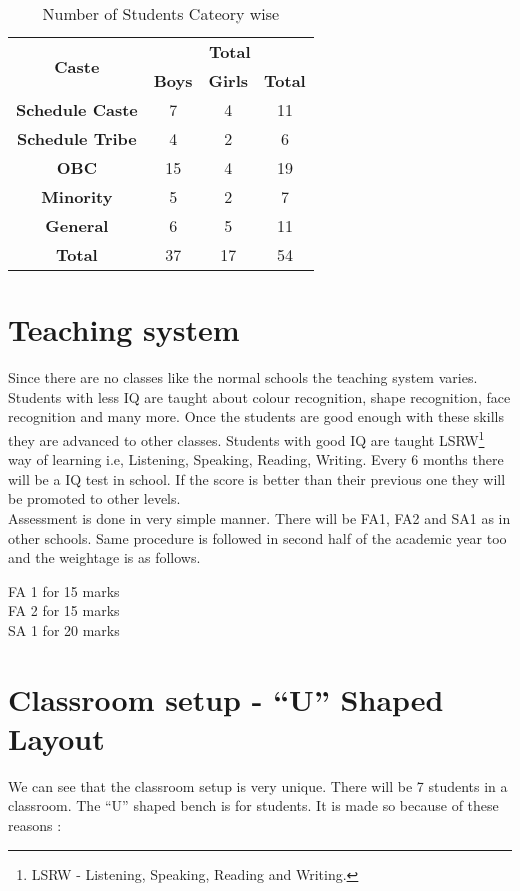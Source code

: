 \begin{table}[H]
    \centering
    \begin{tabular}{|c|c|c|c|} \hline 
        \multirow{2}{*}{\textbf{Caste}} & \multicolumn{3}{c|}{\textbf{Total}} \\ \cline{2-4}
        & \textbf{Boys} & \textbf{Girls} & \textbf{Total} \\ \hline
        \textbf{Schedule Caste} & 7 & 4 & 11  \\ \hline
        \textbf{Schedule Tribe} & 4 & 2 & 6 \\ \hline 
        \textbf{OBC} & 15 & 4 & 19 \\ \hline 
        \textbf{Minority} & 5 & 2 & 7 \\ \hline 
        \textbf{General} & 6 & 5 & 11 \\ \hline 
        \textbf{Total} & 37 & 17 & 54 \\ \hline 
    \end{tabular}
    \caption*{Number of Students Cateory wise}
\end{table}

\section{Teaching system}
Since there are no classes like the normal schools the teaching system varies. Students with less IQ are taught about colour recognition, shape recognition, face recognition and many more. Once the students are good enough with these skills they are advanced to other classes. Students with good IQ are taught LSRW\footnote{LSRW - Listening, Speaking, Reading and Writing.} way of learning i.e, Listening, Speaking, Reading, Writing. Every 6 months there will be a IQ test in school. If the score is better than their previous one they will be promoted to other levels. \\

Assessment is done in very simple manner. There will be FA1, FA2 and SA1 as in other schools. Same procedure is followed in second half of the academic year too and the weightage is as follows.

\begin{tcolorbox}[coltitle=black,colframe=yellow!90,fonttitle=\sffamily\bfseries\large,title=Division of Marks]
FA 1 for 15 marks\\
FA 2 for 15 marks\\ 
SA 1 for 20 marks
\end{tcolorbox}

\section{Classroom setup - ``U'' Shaped Layout}
We can see that the classroom setup is very unique. There will be 7 students in a classroom. The ``U'' shaped bench is for students. It is made so because of these reasons :

